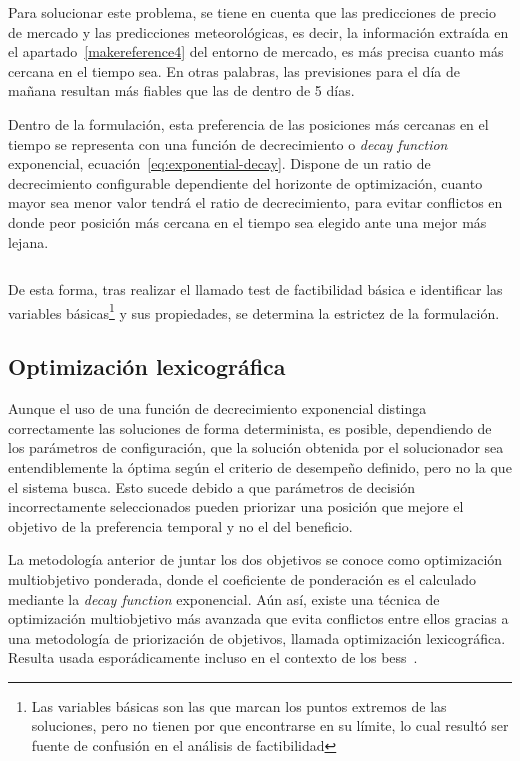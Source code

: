 Para solucionar este problema, se tiene en cuenta que las predicciones de precio de mercado y las predicciones meteorológicas, es decir, la información extraída en el apartado~\ref{makereference4} del entorno de mercado, es más precisa cuanto más cercana en el tiempo sea. En otras palabras, las previsiones para el día de mañana resultan más fiables que las de dentro de 5 días.

Dentro de la formulación, esta preferencia de las posiciones más cercanas en el tiempo se representa con una función de decrecimiento o \textit{decay function} exponencial, ecuación~\ref{eq:exponential-decay}. Dispone de un ratio de decrecimiento configurable dependiente del horizonte de optimización, cuanto mayor sea menor valor tendrá el ratio de decrecimiento, para evitar conflictos en donde peor posición más cercana en el tiempo sea elegido ante una mejor más lejana.

\begin{equation}
  \label{eq:exponential-decay}
\end{equation}

De esta forma, tras realizar el llamado test de factibilidad básica e identificar las variables básicas\footnote{Las variables básicas son las que marcan los puntos extremos de las soluciones, pero no tienen por que encontrarse en su límite, lo cual resultó ser fuente de confusión en el análisis de factibilidad} y sus propiedades, se determina la estrictez de la formulación.

\subsection{Optimización lexicográfica}
\label{makereference5.4.1}

Aunque el uso de una función de decrecimiento exponencial distinga correctamente las soluciones de forma determinista, es posible, dependiendo de los parámetros de configuración, que la solución obtenida por el solucionador sea entendiblemente la óptima según el criterio de desempeño definido, pero no la que el sistema busca. Esto sucede debido a que parámetros de decisión incorrectamente seleccionados pueden priorizar una posición que mejore el objetivo de la preferencia temporal y no el del beneficio.

La metodología anterior de juntar los dos objetivos se conoce como optimización multiobjetivo ponderada, donde el coeficiente de ponderación es el calculado mediante la \textit{decay function} exponencial. Aún así, existe una técnica de optimización multiobjetivo más avanzada que evita conflictos entre ellos gracias a una metodología de priorización de objetivos, llamada optimización lexicográfica. Resulta usada esporádicamente incluso en el contexto de los \gls{bess}~\cite{karimi2019multi}.

